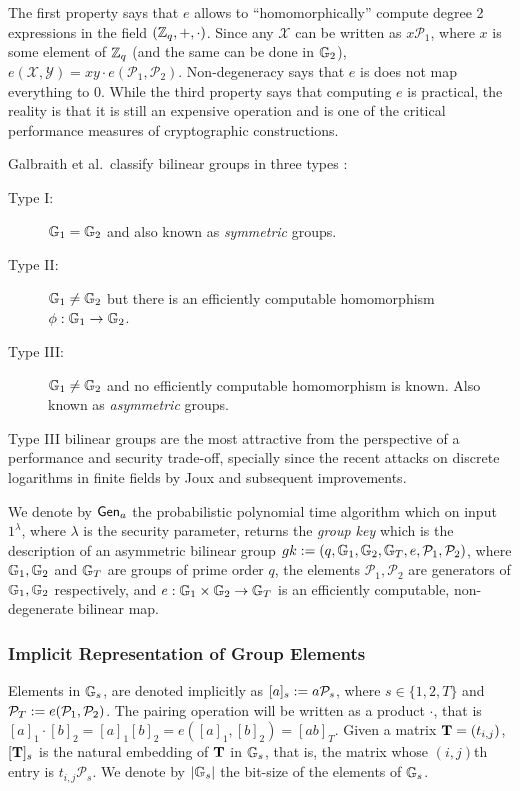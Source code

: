 The first property says that $e$ allows to ``homomorphically'' compute degree 2 expressions in the field $(\mathbb{Z}_q,+,\cdot)$. Since any $\mathcal{X}$ can be written as $x\mathcal{P}_1$, where $x$ is some element of $\mathbb{Z}_q$ (and the same can be done in $\mathbb{G}_2$), $e(\mathcal{X},\mathcal{Y})=xy\cdot e(\mathcal{P}_1,\mathcal{P}_2)$. Non-degeneracy says that $e$ is does not map everything to 0. While the third property says that computing $e$ is practical, the reality is that it is still an expensive operation and is one of the critical performance measures of cryptographic constructions.

Galbraith et al.~classify bilinear groups in three types \cite{DAM:GalPatSma08}:

\begin{description}
\item[Type I:] $\mathbb{G}_1=\mathbb{G}_2$ and also known as \emph{symmetric} groups. 
\item[Type II:] $\mathbb{G}_1\neq\mathbb{G}_2$ but there is an efficiently computable homomorphism $\phi:\mathbb{G}_1\to\mathbb{G}_2$.
\item[Type III:] $\mathbb{G}_1\neq\mathbb{G}_2$ and no efficiently computable homomorphism is known. Also known as \emph{asymmetric} groups.
\end{description}

Type III bilinear groups are the most attractive from the perspective
of a performance and security trade-off, specially since the recent attacks on discrete logarithms in
finite fields by Joux \cite{SAC:Joux13} and subsequent improvements.

We denote by $\mathsf{Gen}_a$ the probabilistic polynomial time algorithm which on input $1^{\lambda}$, where $\lambda$ is the security parameter, returns the \emph{group key} which is the description of an asymmetric bilinear group $gk:=(q,\mathbb{G}_1,\mathbb{G}_2,\mathbb{G}_T,e,\mathcal{P}_1,\mathcal{P}_2)$, where $\mathbb{G}_1,\mathbb{G}_2$
and $\mathbb{G}_T$ are groups of prime order $q$, the elements $\mathcal{P}_1, \mathcal{P}_2$ are generators of 
$\mathbb{G}_1,\mathbb{G}_2$ respectively, and $e:\mathbb{G}_1\times\mathbb{G}_2\to\mathbb{G}_T$ is an efficiently
computable, non-degenerate bilinear map. 

\subsubsection{Implicit Representation of Group Elements}

Elements in $\mathbb{G}_s$, are denoted implicitly as $[a]_s:=a \mathcal{P}_s$, where $s \in \{1,2,T\}$ and $\mathcal{P}_T:=e(\mathcal{P}_1,\mathcal{P}_2)$. 
The pairing operation will be written as a product $\cdot$, that is $[a]_1 \cdot [b]_2=[a]_1 [b]_2=e([a]_1,[b]_2)=[ab]_T$. Given a matrix $\mathbf{{T}}=(t_{i,j})$, $[\mathbf{{T}}]_s$ is
the natural embedding of $\mathbf{{T}}$ in $\mathbb{G}_s$, that is, the matrix whose $(i,j)$th entry
is $t_{i,j}\mathcal{P}_s$. We denote by $|\mathbb{G}_s|$ the bit-size of the elements of $\mathbb{G}_s$.

